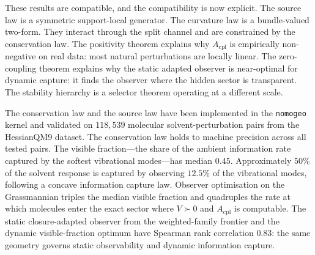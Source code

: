 \documentclass[11pt,a4paper]{article}
\numberwithin{equation}{section}
\theoremstyle{thmcompact}
\theoremstyle{remark}
\begin{document}
These results are compatible, and the compatibility is now explicit. The source law is a symmetric support-local generator. The curvature law is a bundle-valued two-form. They interact through the split channel and are constrained by the conservation law. The positivity theorem explains why $A_{\mathrm{cpl}}$ is empirically non-negative on real data: most natural perturbations are locally linear. The zero-coupling theorem explains why the static adapted observer is near-optimal for dynamic capture: it finds the observer where the hidden sector is transparent. The stability hierarchy is a selector theorem operating at a different scale.

The conservation law and the source law have been implemented in the \texttt{nomogeo} kernel and validated on $118{,}539$ molecular solvent-perturbation pairs from the HessianQM9 dataset. The conservation law holds to machine precision across all tested pairs. The visible fraction---the share of the ambient information rate captured by the softest vibrational modes---has median $0.45$. Approximately $50\%$ of the solvent response is captured by observing $12.5\%$ of the vibrational modes, following a concave information capture law. Observer optimisation on the Grassmannian triples the median visible fraction and quadruples the rate at which molecules enter the exact sector where $V\succ 0$ and $A_{\mathrm{cpl}}$ is computable. The static closure-adapted observer from the weighted-family frontier and the dynamic visible-fraction optimum have Spearman rank correlation $0.83$: the same geometry governs static observability and dynamic information capture.
\end{document}
